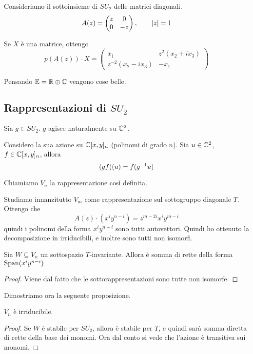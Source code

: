 Consideriamo il sottoinsieme di $SU_2$ delle matrici diagonali.
\[
	A(z) = \left(
		\begin{matrix}
		z & 0 \\
		0 & -z
		\end{matrix}
	\right), \qquad \left|z\right|=1
\]

Se $X$ è una matrice, ottengo
\[
	p(A(z))\cdot X = \left( 
	\begin{matrix}
		x_1 & z^2(x_2+ix_3) \\
		z^{-2}(x_2-ix_3) & -x_1
	\end{matrix}
	\right)
\]

Pensando $\mathbb E = \mathbb R \oplus \mathbb C$ vengono cose belle.

\subsection{Rappresentazioni di $SU_2$}
	Sia $g \in SU_2$. $g$ agisce naturalmente su $\mathbb C^2$.
	
	Considero la sua azione su $\mathbb C[x,y]_n$ (polinomi di grado $n$). Sia $u \in \mathbb C^2$, $f \in \mathbb C[x,y]_n$, allora 
	\[
	 (gf)(u) = f(g^{-1} u)
	\]
	
	Chiamiamo $V_n$ la rappresentazione così definita.

	Studiamo innanzitutto $V_m$ come rappresentazione sul sottogruppo diagonale $T$.
	Ottengo che 
	\[
		A(z) \cdot (x^i y^{n-i}) = z^{m-2i}x^iy^{m-i}
	\]
	quindi i polinomi della forma $x^iy^{n-i}$ sono tutti autovettori. Quindi ho ottenuto la decomposizione in irriducibili, e inoltre sono tutti non isomorfi.
	
	\begin{mylemma}
	 Sia $W\subseteq V_n$ un sottospazio $T$-invariante. Allora è somma di rette della forma $\operatorname{Span}(x^iy^{n-i})$
	\end{mylemma}
	\begin{proof}
		Viene dal fatto che le sottorappresentazioni sono tutte non isomorfe.
	\end{proof}

	Dimostriamo ora la seguente proposizione.
	\begin{myprop}
	 $V_n$ è irriducibile.
	\end{myprop}
	\begin{proof}
	 Se $W$ è stabile per $SU_2$, allora è stabile per $T$, e quindi sarà somma diretta di rette della base dei monomi. Ora dal conto si vede che l'azione è transitiva sui monomi. 
	\end{proof}


	



